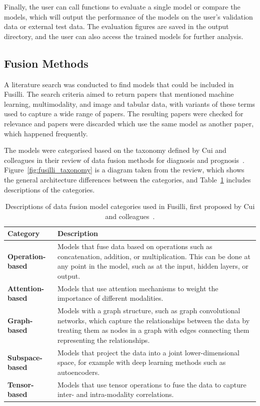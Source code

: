 Finally, the user can call functions to evaluate a single model or compare the models, which will output the performance of the models on the user's validation data or external test data.
The evaluation figures are saved in the output directory, and the user can also access the trained models for further analysis.

\subsection{Fusion Methods}

A literature search was conducted to find models that could be included in Fusilli.
The search criteria aimed to return papers that mentioned machine learning, multimodality, and image and tabular data, with variants of these terms used to capture a wide range of papers.
The resulting papers were checked for relevance and papers were discarded which use the same model as another paper, which happened frequently.

The models were categorised based on the taxonomy defined by Cui and colleagues in their review of data fusion methods for diagnosis and prognosis~\cite{cuiDeepMultimodalFusion2022}.
Figure~\ref{fig:fusilli_taxonomy} is a diagram taken from the review, which shows the general architecture differences between the categories, and Table~\ref{tab:fusilli_taxonomy} includes descriptions of the categories.

\begin{table}
    \centering
    \caption{Descriptions of data fusion model categories used in Fusilli, first proposed by Cui and colleagues~\cite{cuiDeepMultimodalFusion2022}.}
    \label{tab:fusilli_taxonomy}
    \begin{tabular}{|p{}p{}|}
        \hline
        \textbf{Category} & \textbf{Description} \\ \hline
        \textbf{Operation-based} & Models that fuse data based on operations such as concatenation, addition, or multiplication. This can be done at any point in the model, such as at the input, hidden layers, or output. \\ \hline
        \textbf{Attention-based} & Models that use attention mechanisms to weight the importance of different modalities. \\ \hline
        \textbf{Graph-based} & Models with a graph structure, such as graph convolutional networks, which capture the relationships between the data by treating them as nodes in a graph with edges connecting them representing the relationships. \\ \hline
        \textbf{Subspace-based} & Models that project the data into a joint lower-dimensional space, for example with deep learning methods such as autoencoders. \\ \hline
        \textbf{Tensor-based} & Models that use tensor operations to fuse the data to capture inter- and intra-modality correlations. \\ \hline
    \end{tabular}
\end{table}

